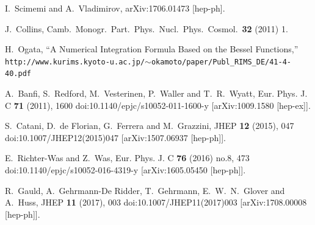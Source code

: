 \documentclass[10pt,a4paper]{article}
\begin{document}
\begin{thebibliography}{alp}

  I.~Scimemi and A.~Vladimirov,
  arXiv:1706.01473 [hep-ph].

  J.~Collins,
  Camb.\ Monogr.\ Part.\ Phys.\ Nucl.\ Phys.\ Cosmol.\  {\bf 32} (2011) 1.

  H.~Ogata,
  ``A Numerical Integration Formula Based on the Bessel Functions,''
  \texttt{http://www.kurims.kyoto-u.ac.jp/$\sim$okamoto/paper/Publ\_RIMS\_DE/41-4-40.pdf}

A.~Banfi, S.~Redford, M.~Vesterinen, P.~Waller and T.~R.~Wyatt,
Eur. Phys. J. C \textbf{71} (2011), 1600
doi:10.1140/epjc/s10052-011-1600-y
[arXiv:1009.1580 [hep-ex]].

S.~Catani, D.~de Florian, G.~Ferrera and M.~Grazzini,
JHEP \textbf{12} (2015), 047
doi:10.1007/JHEP12(2015)047
[arXiv:1507.06937 [hep-ph]].

E.~Richter-Was and Z.~Was,
Eur. Phys. J. C \textbf{76} (2016) no.8, 473
doi:10.1140/epjc/s10052-016-4319-y
[arXiv:1605.05450 [hep-ph]].

R.~Gauld, A.~Gehrmann-De Ridder, T.~Gehrmann, E.~W.~N.~Glover and A.~Huss,
JHEP \textbf{11} (2017), 003
doi:10.1007/JHEP11(2017)003
[arXiv:1708.00008 [hep-ph]].

\end{thebibliography}
\end{document}
